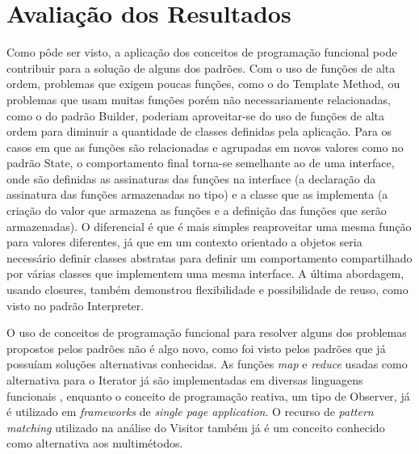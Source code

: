 \section{Avaliação dos Resultados}

Como pôde ser visto, a aplicação dos 
conceitos de programação funcional pode 
contribuir para a solução de alguns dos padrões. 
Com o uso de funções de alta ordem, problemas 
que exigem poucas funções, como o do Template 
Method, ou problemas que usam muitas funções 
porém não necessariamente relacionadas, como 
o do padrão Builder, poderiam aproveitar-se do 
uso de funções de alta ordem para diminuir a 
quantidade de classes definidas pela 
aplicação. Para os casos em que as funções 
são relacionadas e agrupadas em 
novos valores como no padrão State, 
o comportamento final torna-se semelhante 
ao de uma interface, onde são definidas 
as assinaturas das funções na interface 
(a declaração da assinatura das funções armazenadas 
no tipo) e a classe que as implementa 
(a criação do valor que armazena as 
funções e a definição das funções que 
serão armazenadas). O diferencial é que 
é mais simples reaproveitar uma mesma 
função para valores diferentes, já que 
em um contexto orientado a objetos seria 
necessário definir classes abstratas 
para definir um comportamento compartilhado 
por várias classes que implementem uma 
mesma interface.
A última abordagem, usando closures, também 
demonstrou flexibilidade e possibilidade 
de reuso, como visto no padrão Interpreter. 

O uso de conceitos de programação funcional 
para resolver alguns dos problemas propostos 
pelos padrões não é algo novo, como foi visto 
pelos padrões que já possuíam soluções alternativas 
conhecidas. As funções \textit{map} e \textit{reduce} 
usadas como alternativa para o Iterator já 
são implementadas em diversas linguagens funcionais
\cite{realworldhaskell,wampler2021,braveclojure}, 
enquanto o conceito de programação reativa, 
um tipo de Observer, já é 
utilizado em \textit{frameworks} de  
\textit{single page application}\cite{rxjs}. 
O recurso de \textit{pattern matching} 
utilizado na análise do Visitor também já 
é um conceito conhecido como alternativa 
aos multimétodos\cite{patternmatchingvisitor}.

